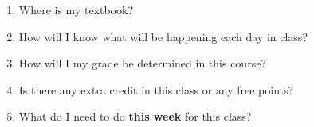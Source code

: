 \documentclass[11pt,fleqn]{article}
\begin{document}
\begin{enumerate}
\vfill
\item Where is my textbook?\\
\vfill
\item How will I know what will be happening each day in class?
\vfill
\item How will I my grade be determined in this course? \\
\vfill
\item Is there any extra credit in this class or any free points?\\
\vfill
\item What do I need to do \textbf{this week} for this class?\\
\vfill


\end{enumerate}
\end{document}
